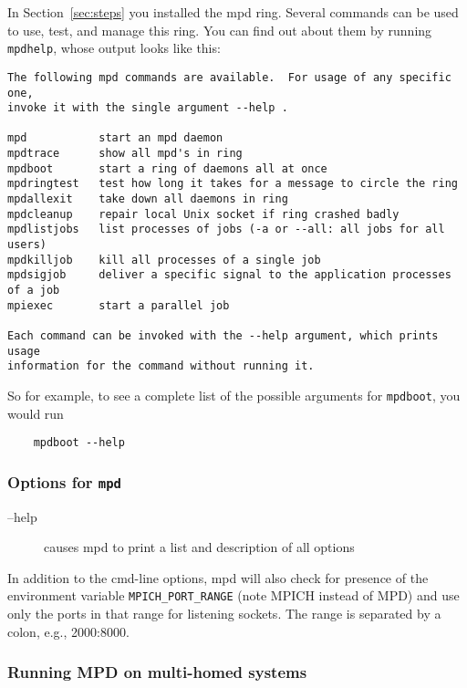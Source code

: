 \documentclass[dvipdfm,11pt]{article}
\begin{document}
In Section~\ref{sec:steps} you installed the mpd ring.  Several commands
can be used to use, test, and manage this ring.  You can find out about
them by running \texttt{mpdhelp}, whose output looks like this:

\begin{small}
\begin{verbatim}
The following mpd commands are available.  For usage of any specific one,
invoke it with the single argument --help .

mpd           start an mpd daemon
mpdtrace      show all mpd's in ring
mpdboot       start a ring of daemons all at once
mpdringtest   test how long it takes for a message to circle the ring 
mpdallexit    take down all daemons in ring
mpdcleanup    repair local Unix socket if ring crashed badly
mpdlistjobs   list processes of jobs (-a or --all: all jobs for all users)
mpdkilljob    kill all processes of a single job
mpdsigjob     deliver a specific signal to the application processes of a job
mpiexec       start a parallel job

Each command can be invoked with the --help argument, which prints usage
information for the command without running it.
\end{verbatim}
\end{small}
So for example, to see a complete list of the possible arguments for
\texttt{mpdboot}, you would run
\begin{verbatim}
    mpdboot --help
\end{verbatim}


\subsubsection{Options for \texttt{mpd}}

\begin{description}
\item[--help] causes mpd to print a list and description of all options
\end{description}

In addition to the cmd-line options, mpd will also check for presence of
the environment variable \texttt{MPICH\_PORT\_RANGE} (note MPICH instead of MPD)
and use only the ports in that range for listening sockets.  The range
is separated by a colon, e.g., 2000:8000.


\subsubsection{Running MPD on multi-homed systems}
\label{sec:mpd-multi-homed}
\end{document}
